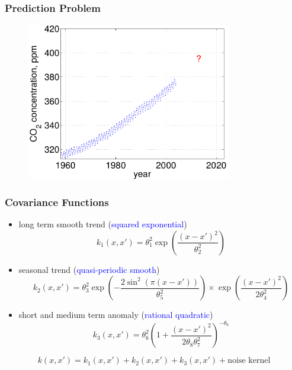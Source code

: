 \documentclass[10pt]{beamer}
\begin{document}
  \begin{frame}
    \frametitle{Prediction Problem}

    \begin{figure}
      \centering
      \includegraphics[width=0.8\textwidth]{prediction1.png}
    \end{figure}
  \end{frame}

  \begin{frame}
    \frametitle{Covariance Functions}

    \begin{itemize}
      \item long term smooth trend (\textcolor{blue}{squared exponential})
        \begin{equation*}
          k_1(x,x') = \theta_1^2 \exp \left( \frac{(x - x')^2}{\theta_2^2} \right)
        \end{equation*}
      \item seasonal trend (\textcolor{blue}{quasi-periodic smooth})
        \begin{equation*}
          k_2(x,x') = \theta_3^2 \exp \left( - \frac{2 \sin^2 (\pi (x - x'))}{\theta_5^2} \right) \times \exp \left( \frac{(x - x')^2}{2 \theta_4^2} \right)
        \end{equation*}
      \item short and medium term anomaly (\textcolor{blue}{rational quadratic})
        \begin{equation*}
          k_3(x,x') = \theta_6^2 \left( 1 + \frac{(x - x')^2}{2 \theta_8 \theta_7^2} \right)^{- \theta_8}
        \end{equation*}
    \end{itemize}

    \begin{equation*}
      k(x,x') = k_1(x,x') + k_2(x,x') + k_3(x,x') + \text{noise kernel}
    \end{equation*}
  \end{frame}
\end{document}
